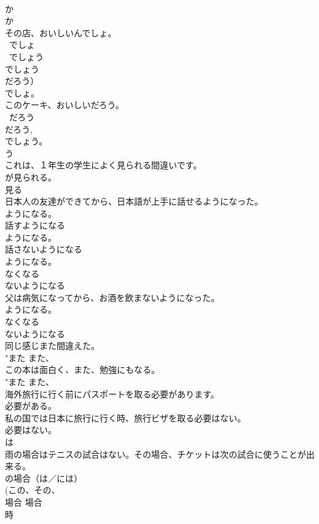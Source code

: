 \documentclass[8pt]{extreport}
\begin{document}
\begin{CJK}{UTF8}{min}
{\\	か
\\	か　 
\\	その店、おいしいんでしょ。	
\\	~でしょ 
\\	~でしょう　
\\	でしょう 
\\	だろう）
\\	でしょ。
\\	このケーキ、おいしいだろう。	
\\	~だろう
\\	だろう, 
\\	でしょう。
\\	う　
\\	これは、１年生の学生によく見られる間違いです。	
\\	が見られる。 
\\	見る 
\\	日本人の友達ができてから、日本語が上手に話せるようになった。	
\\	ようになる。 
\\	話すようになる	
\\	ようになる。 
\\	話さないようになる	
\\	ようになる。 
\\	なくなる 
\\	ないようになる 
\\	父は病気になってから、お酒を飲まないようになった。	
\\	ようになる。 
\\	なくなる 
\\	ないようになる 
\\	同じ感じまた間違えた。	
\\	"また また、
\\	この本は面白く、また、勉強にもなる。	
\\	"また また、
\\	海外旅行に行く前にパスポートを取る必要があります。	
\\	必要がある。 
\\	私の国では日本に旅行に行く時、旅行ビザを取る必要はない。	
\\	必要はない。 
\\	は 
\\	雨の場合はテニスの試合はない。その場合、チケットは次の試合に使うことが出来る。	
\\	の場合（は／には） 
\\	(この、その、
\\	場合 場合 
\\	時　
}
\end{CJK}
\end{document}
